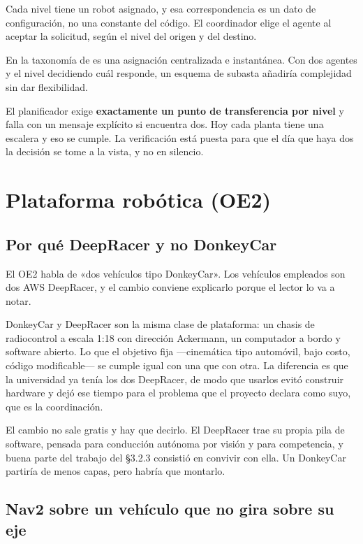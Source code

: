 Cada nivel tiene un robot asignado, y esa correspondencia es un dato de
configuración, no una constante del código. El coordinador elige el agente al
aceptar la solicitud, según el nivel del origen y del destino.

En la taxonomía de \textcite{gerkey2004taxonomy} es una asignación
centralizada e instantánea. Con dos agentes y el nivel decidiendo cuál responde,
un esquema de subasta añadiría complejidad sin dar flexibilidad.

El planificador exige \textbf{exactamente un punto de transferencia por nivel} y
falla con un mensaje explícito si encuentra dos. Hoy cada planta tiene una
escalera y eso se cumple. La verificación está puesta para que el día que haya
dos la decisión se tome a la vista, y no en silencio.

\section{Plataforma robótica (OE2)}

\subsection{Por qué DeepRacer y no DonkeyCar}

El OE2 habla de «dos vehículos tipo DonkeyCar». Los vehículos empleados son dos
AWS DeepRacer, y el cambio conviene explicarlo porque el lector lo va a notar.

DonkeyCar y DeepRacer son la misma clase de plataforma: un chasis de
radiocontrol a escala 1:18 con dirección Ackermann, un computador a bordo y
software abierto. Lo que el objetivo fija —cinemática tipo automóvil, bajo costo,
código modificable— se cumple igual con una que con otra. La diferencia es que la
universidad ya tenía los dos DeepRacer, de modo que usarlos evitó construir
hardware y dejó ese tiempo para el problema que el proyecto declara como suyo,
que es la coordinación.

El cambio no sale gratis y hay que decirlo. El DeepRacer trae su propia pila de
software, pensada para conducción autónoma por visión y para competencia, y buena
parte del trabajo del §3.2.3 consistió en convivir con ella. Un DonkeyCar partiría
de menos capas, pero habría que montarlo.

\subsection{Nav2 sobre un vehículo que no gira sobre su eje}


